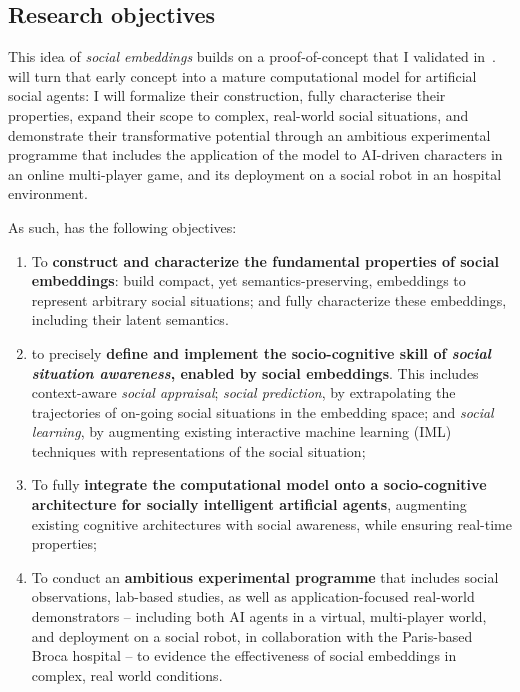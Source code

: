 \subsection{Research objectives}


This idea of \emph{social embeddings} builds on a proof-of-concept that I
validated in~\cite{lemaignan2024social}. \project will turn that early concept
into a mature computational model for artificial social agents: I will formalize
their construction,  fully characterise their properties, expand their scope to
complex, real-world social situations, and demonstrate their transformative
potential through an ambitious experimental programme that includes the application of
the model to AI-driven characters in an online multi-player game, and
its deployment on a social robot in an hospital environment.

As such, \project has the following objectives:

\begin{enumerate}[label=\textbf{O\arabic*}]
    \item \label{O1} To \textbf{construct and characterize the fundamental
        properties of social embeddings}: build compact, yet
        semantics-preserving, embeddings to represent arbitrary social
        situations; and fully characterize these embeddings, including their
        latent semantics.

    \item \label{O2} to precisely \textbf{define and implement the socio-cognitive skill of
        \emph{social situation awareness}, enabled by social embeddings}. This
        includes context-aware \emph{social appraisal};
        \emph{social prediction}, by extrapolating the trajectories of on-going social situations in the
        embedding space; and \emph{social learning}, by augmenting existing interactive machine
        learning (IML) techniques with representations of the social situation;

    \item \label{O3} To fully {\bf integrate the \project computational model onto a
        socio-cognitive architecture for socially intelligent artificial
        agents}, augmenting existing cognitive architectures with social
        awareness, while ensuring real-time properties;

    \item \label{O4} To conduct an {\bf ambitious experimental programme} that
        includes social observations, lab-based studies, as well as
        application-focused real-world demonstrators -- including both AI agents in a
        virtual, multi-player world, and deployment on a social robot, in
        collaboration with the Paris-based Broca hospital -- to evidence the
        effectiveness of social embeddings in complex, real world conditions.

\end{enumerate}


